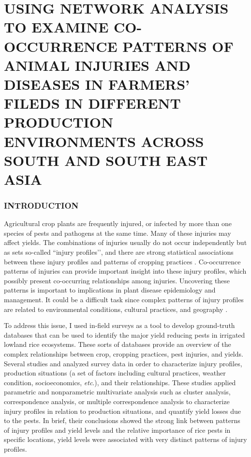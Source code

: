 \chapter{USING NETWORK ANALYSIS TO EXAMINE CO-OCCURRENCE PATTERNS OF ANIMAL INJURIES AND DISEASES IN FARMERS' FILEDS IN DIFFERENT PRODUCTION ENVIRONMENTS ACROSS SOUTH AND SOUTH EAST ASIA}

\subsection{INTRODUCTION}

Agricultural crop plants are frequently injured, or infected by more than one species of pests and pathogens at the same time. Many of these injuries may affect yields. The combinations of injuries usually do not occur independently but as sets so-called ``injury profiles’’, and there are strong statistical associations between these injury profiles and patterns of cropping practices \citep{Savary_2006_Quantification}. Co-occurrence patterns of injuries can provide important insight into these injury profiles, which possibly present co-occurring relationships among injuries. Uncovering these patterns is important to implications in plant disease epidemiology and management. It could be a difficult task since complex patterns of injury profiles are related to environmental conditions, cultural practices, and geography \citep{Willocquet_2008_Simulating}. 

To address this issue, I used in-field surveys as a tool to develop ground-truth databases that can be used to identify the major yield reducing pests in irrigated lowland rice ecosystems. These sorts of databases provide an overview of the complex relationships between crop, cropping practices, pest injuries, and yields. Several studies \citet{Savary_2000_Quantification, Savary_2000_Characterization, Dong_2010_Characterization} and \citet{Reddy_2011_Characterizing} analyzed survey data in order to characterize injury profiles, production situations (a set of factors including cultural practices, weather condition, socioeconomics, \textit{etc}.), and their relationships. These studies applied parametric and nonparametric multivariate analysis such as cluster analysis, correspondence analysis, or multiple correspondence analysis to characterize injury profiles in relation to production situations, and quantify yield losses due to the pests. In brief, their conclusions showed the strong link between patterns of injury profiles and yield levels and the relative importance of rice pests in specific locations, yield levels were associated with very distinct patterns of injury profiles.


